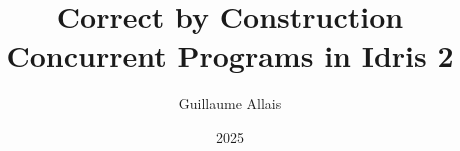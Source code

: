 \documentclass{beamer}
\title{Correct by Construction Concurrent Programs in Idris 2}
\author{Guillaume Allais}
\institute{University of Strathclyde \\ Glasgow, UK}
\date{2025}
\begin{document}
\begin{frame}
  \maketitle
\end{frame}




\end{document}
